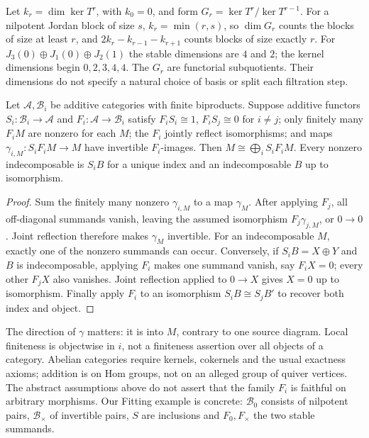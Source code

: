 Let $k_r=\dim\ker T^r$, with $k_0=0$, and form
$G_r=\ker T^r/\ker T^{r-1}$. For a nilpotent Jordan block of size $s$,
$k_r=\min(r,s)$, so $\dim G_r$ counts the blocks of size at least $r$,
and $2k_r-k_{r-1}-k_{r+1}$ counts blocks of size exactly $r$.
For $J_3(0)\oplus J_1(0)\oplus J_2(1)$ the stable dimensions are
$4$ and $2$; the kernel dimensions begin $0,2,3,4,4$.
The $G_r$ are functorial subquotients. Their dimensions do not specify a
natural choice of basis or split each filtration step.

\begin{proposition}
Let $\mathcal A,\mathcal B_i$ be additive categories with finite
biproducts. Suppose additive functors $S_i:\mathcal B_i\to\mathcal A$
and $F_i:\mathcal A\to\mathcal B_i$ satisfy
$F_iS_i\cong1$, $F_iS_j\cong0$ for $i\ne j$; only finitely many
$F_iM$ are nonzero for each $M$; the $F_i$ jointly reflect isomorphisms;
and maps $\gamma_{i,M}:S_iF_iM\to M$ have invertible $F_i$-images.
Then $M\cong\bigoplus_i S_iF_iM$. Every nonzero indecomposable is
$S_iB$ for a unique index and an indecomposable $B$ up to isomorphism.
\end{proposition}
\begin{proof}
Sum the finitely many nonzero $\gamma_{i,M}$ to a map $\gamma_M$.
After applying $F_j$, all off-diagonal summands vanish, leaving the
assumed isomorphism $F_j\gamma_{j,M}$, or $0\to0$. Joint reflection
therefore makes $\gamma_M$ invertible. For an indecomposable $M$, exactly
one of the nonzero summands can occur. Conversely, if $S_iB=X\oplus Y$
and $B$ is indecomposable, applying $F_i$ makes one summand vanish, say
$F_iX=0$; every other $F_jX$ also vanishes. Joint reflection applied to
$0\to X$ gives $X=0$ up to isomorphism. Finally apply $F_i$ to an
isomorphism $S_iB\cong S_jB'$ to recover both index and object.
\end{proof}
The direction of $\gamma$ matters: it is into $M$, contrary to one source
diagram. Local finiteness is objectwise in $i$, not a finiteness assertion
over all objects of a category. Abelian categories require kernels,
cokernels and the usual exactness axioms; addition is on Hom groups, not
on an alleged group of quiver vertices. The abstract assumptions above
do not assert that the family $F_i$ is faithful on arbitrary morphisms.
Our Fitting example is concrete: $\mathcal B_0$ consists of nilpotent
pairs, $\mathcal B_\times$ of invertible pairs, $S$ are inclusions and
$F_0,F_\times$ the two stable summands.

